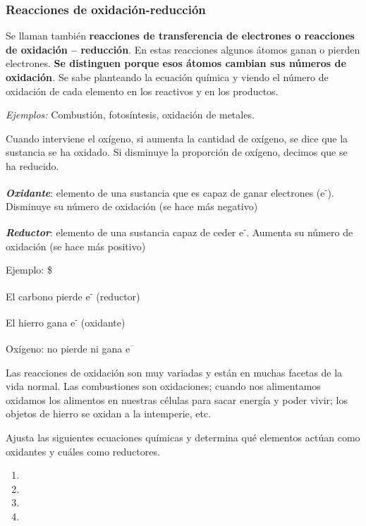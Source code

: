 \documentclass[
  spanish,
]{article}
\begin{document}
\hypertarget{reacciones-de-oxidaciuxf3n-reducciuxf3n}{%
\subsubsection{Reacciones de
oxidación-reducción}\label{reacciones-de-oxidaciuxf3n-reducciuxf3n}}

Se llaman también \textbf{reacciones de transferencia de electrones o
reacciones de oxidación -- reducción}. En estas reacciones algunos
átomos ganan o pierden electrones. \textbf{Se distinguen porque esos
átomos cambian sus números de oxidación}\emph{.} Se sabe planteando la
ecuación química y viendo el número de oxidación de cada elemento en los
reactivos y en los productos.

\emph{Ejemplos:} Combustión, fotosíntesis, oxidación de metales.

Cuando interviene el oxígeno, si aumenta la cantidad de oxígeno, se dice
que la sustancia se ha oxidado. Si disminuye la proporción de oxígeno,
decimos que se ha reducido.

\textbf{\emph{Oxidante}}: elemento de una sustancia que es capaz de
ganar electrones (e\textsuperscript{-}). Disminuye su número de
oxidación (se hace más negativo)

\textbf{\emph{Reductor}}: elemento de una sustancia capaz de ceder
e\textsuperscript{-}. Aumenta su número de oxidación (se hace más
positivo)

Ejemplo: \$

El carbono pierde e\textsuperscript{-}  (reductor)

El hierro gana e\textsuperscript{-}  (oxidante)

Oxígeno: no pierde ni gana e\textsuperscript{--}

Las reacciones de oxidación son muy variadas y están en muchas facetas
de la vida normal. Las combustiones son oxidaciones; cuando nos
alimentamos oxidamos los alimentos en nuestras células para sacar
energía y poder vivir; los objetos de hierro se oxidan a la intemperie,
etc.

\begin{exercise}Ajusta las siguientes ecuaciones químicas y determina
qué elementos actúan como oxidantes y cuáles como reductores.

\begin{enumerate}
\def\labelenumi{\alph{enumi})}
\item
\item
\item
\item
\end{enumerate}

\end{exercise}
\end{document}
